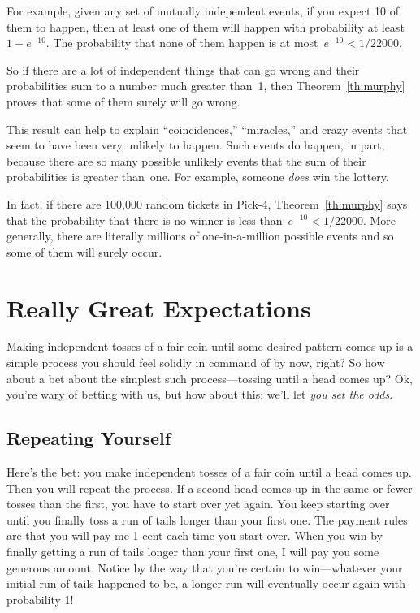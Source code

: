 For example, given any set of mutually independent events, if you
expect 10 of them to happen, then at least one of them will happen
with probability at least~$1 - e^{-10}$.  The probability that none of
them happen is at most~$e^{-10} < 1/22000$.

So if there are a lot of independent things that can go wrong and their
probabilities sum to a number much greater than~1, then
Theorem~\ref{th:murphy} proves that some of them surely will go wrong.

This result can help to explain ``coincidences,'' ``miracles,'' and
crazy events that seem to have been very unlikely to happen.  Such
events do happen, in part, because there are so many possible unlikely
events that the sum of their probabilities is greater than~one.  For
example, someone \emph{does} win the lottery.

In fact, if there are 100,000 random tickets in Pick-4,
Theorem~\ref{th:murphy} says that the probability that there is no
winner is less than~$e^{-10} < 1/22000$.  More generally, there are
literally millions of one-in-a-million possible events and so some of
them will surely occur.

\begin{problems}
\practiceproblems
{}

\classproblems
{}

\homeworkproblems
{}

\end{problems}

\section{Really Great Expectations}\label{infinite_expect_sec}

Making independent tosses of a fair coin until some desired pattern
comes up is a simple process you should feel solidly in command of by
now, right?  So how about a bet about the simplest such
process---tossing until a head comes up?  Ok, you're wary of betting
with us, but how about this: we'll let \emph{you set the odds}.

\subsection{Repeating Yourself}\label{infinite_repeat_subsec}
Here's the bet: you make independent tosses of a fair coin until a
head comes up.  Then you will repeat the process.  If a second head
comes up in the same or fewer tosses than the first, you have to start
over yet again.  You keep starting over until you finally toss a run
of tails longer than your first one.  The payment rules are that you
will pay me 1 cent each time you start over.  When you win by finally
getting a run of tails longer than your first one, I will pay you some
generous amount.  Notice by the way that you're certain to
win---whatever your initial run of tails happened to be, a longer run
will eventually occur again with probability 1!


